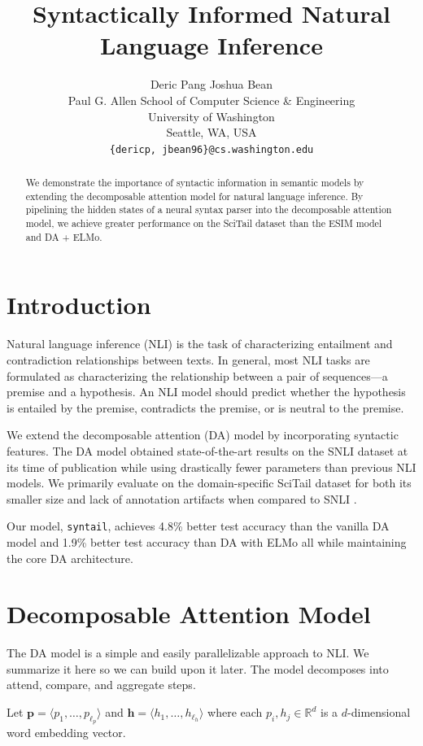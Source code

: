 \documentclass[11pt,a4paper]{article}
\title{Syntactically Informed Natural Language Inference}
\author{
  Deric Pang \quad
  Joshua Bean \\
  Paul G. Allen School of Computer Science \& Engineering \\
  University of Washington \\
  Seattle, WA, USA \\
  {\tt \{dericp, jbean96\}@cs.washington.edu} \\
}
\date{}
\begin{document}
\maketitle
\begin{abstract}
We demonstrate the importance of syntactic information in semantic models by extending the
decomposable attention model for natural language inference.
By pipelining the hidden states of a neural syntax parser into the decomposable
attention model, we achieve greater performance on the SciTail dataset
than the ESIM model and DA + ELMo.
\end{abstract}

\section{Introduction}

Natural language inference (NLI) is the task of characterizing entailment and
contradiction relationships between texts.
In general, most NLI tasks are formulated as characterizing the relationship
between a pair of sequences---a premise and a hypothesis. An NLI model should
predict whether the hypothesis is entailed by the premise, contradicts the
premise, or is neutral to the premise.

We extend the decomposable attention (DA) model by \citet{Parikh2016-em}
incorporating syntactic features.
The DA model obtained state-of-the-art results on the
SNLI \citep{Bowman2015-is} dataset at its time of publication while using
drastically fewer parameters than previous NLI models.
We primarily
evaluate on the domain-specific SciTail dataset \citep{Khot2018-th}
for both its smaller size and lack of annotation artifacts when compared to SNLI
\citep{Gururangan2018-lj}.

Our model, \texttt{syntail}, achieves 4.8\% better 
test accuracy than the vanilla
DA model and 1.9\% better test accuracy than DA with ELMo \citep{Peters2018-fz}
all while maintaining the core DA architecture.

\section{Decomposable Attention Model}

The DA model is a simple and easily parallelizable approach to NLI.
We summarize it here so we can build upon it later.
The model
decomposes into attend, compare, and aggregate steps.

Let
$\bm{p} = \langle p_1, \dots, p_{\ell_p} \rangle$ and
$\bm{h} = \langle h_1, \dots, h_{\ell_h} \rangle$ where each $p_i, h_j \in \mathbb{R}^d$
is a $d$-dimensional word embedding vector.
\end{document}
